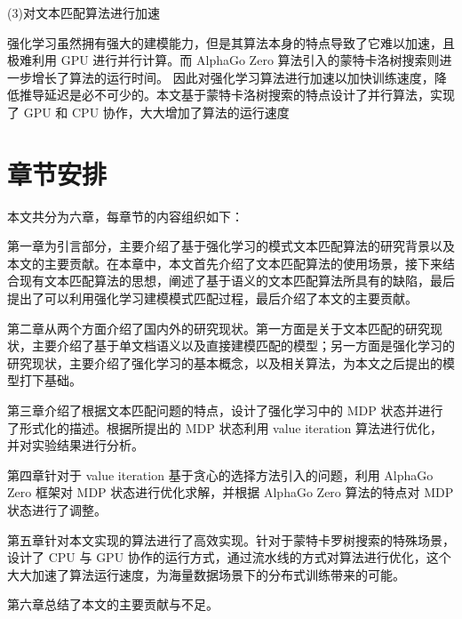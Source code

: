 (3)对文本匹配算法进行加速

强化学习虽然拥有强大的建模能力，但是其算法本身的特点导致了它难以加速，且极难利用 GPU 进行并行计算。而 AlphaGo Zero 算法引入的蒙特卡洛树搜索则进一步增长了算法的运行时间。
因此对强化学习算法进行加速以加快训练速度，降低推导延迟是必不可少的。本文基于蒙特卡洛树搜索的特点设计了并行算法，实现了 GPU 和 CPU 协作，大大增加了算法的运行速度

\section{章节安排}
本文共分为六章，每章节的内容组织如下：

第一章为引言部分，主要介绍了基于强化学习的模式文本匹配算法的研究背景以及本文的主要贡献。在本章中，本文首先介绍了文本匹配算法的使用场景，接下来结合现有文本匹配算法的思想，阐述了基于语义的文本匹配算法所具有的缺陷，最后提出了可以利用强化学习建模模式匹配过程，最后介绍了本文的主要贡献。

第二章从两个方面介绍了国内外的研究现状。第一方面是关于文本匹配的研究现状，主要介绍了基于单文档语义以及直接建模匹配的模型；另一方面是强化学习的研究现状，主要介绍了强化学习的基本概念，以及相关算法，为本文之后提出的模型打下基础。

第三章介绍了根据文本匹配问题的特点，设计了强化学习中的 MDP 状态并进行了形式化的描述。根据所提出的 MDP 状态利用 value iteration 算法进行优化，并对实验结果进行分析。

第四章针对于 value iteration 基于贪心的选择方法引入的问题，利用 AlphaGo Zero 框架对 MDP 状态进行优化求解，并根据 AlphaGo Zero 算法的特点对 MDP 状态进行了调整。

第五章针对本文实现的算法进行了高效实现。针对于蒙特卡罗树搜索的特殊场景，设计了 CPU 与 GPU 协作的运行方式，通过流水线的方式对算法进行优化，这个大大加速了算法运行速度，为海量数据场景下的分布式训练带来的可能。

第六章总结了本文的主要贡献与不足。

